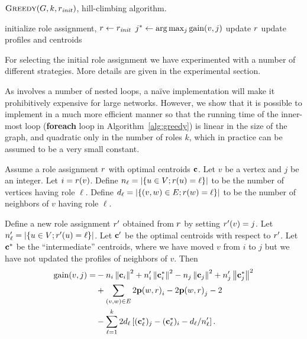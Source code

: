 \begin{algorithm}[t]
\caption{$\textsc{Greedy}(G, k, r_{\mathit{init}})$, hill-climbing algorithm.}
\label{alg:greedy}
initialize role assignment, $r \leftarrow r_{\mathit{init}}$\; 
 {
	 {
		$j^* \define \arg \max_j \gain{v, j}$\;
		 {
			update $r$\;
			update profiles and centroids\;
		}
	}
}
\end{algorithm}

For selecting the initial role assignment
we have experimented with a number of different strategies. 
More details are given in the experimental section.

As \alggreedy involves a number of nested loops, 
a na\"{i}ve implementation will make it prohibitively expensive for large networks.
However, we show that it is possible to implement \alggreedy 
in a much more efficient manner
so that the running time of the inner-most loop
({\bf foreach} loop in Algorithm~\ref{alg:greedy}) 
is linear in the size of the graph, 
and quadratic only in the number of roles $k$, 
which in practice can be assumed to be a very small constant.

\begin{proposition}
\label{prop:fastgain}
Assume a role assignment $r$ with optimal centroids $\mathbf{c}$. 
Let $v$ be a vertex and $j$ be an integer.
Let $i = r(v)$.
Define $n_\ell = {\left|\left\{u \in V ; r(u) = \ell\right\}\right|}$ to be the number of vertices having role $\ell$.
Define $d_\ell = {\left|\left\{(v, w) \in E ; r(w) = \ell\right\}\right|}$ to be the number of neighbors of $v$ having role $\ell$.

Define a new role assignment $r'$ obtained from $r$ by setting $r'(v) = j$.
Let $n'_\ell = {\left|\left\{u \in V ; r'(u) = \ell\right\}\right|}$.
Let $\mathbf{c}'$ be the optimal centroids with respect to $r'$. 
Let $\mathbf{c}^*$ be the ``intermediate'' centroids, where we have moved $v$ from $i$ to $j$ but we have not
updated the profiles of neighbors of $v$.  Then 
\[
\begin{split}
	\gain{v, j} = 
	& - n_i\norm{\centroid_i}^2 + n_i'\norm{\centroid_i^*}^2 - n_j\norm{\centroid_j}^2 + n_j'\norm{\centroid_j^*}^2 \\
	& + \sum_{(v, w) \in E} 2\prof{w, \role}_i - 2\prof{w, \role}_j  - 2  \\
	& - \sum_{\ell = 1}^k 2d_\ell \spr{(\centroid_\ell^*)_j  - (\centroid_\ell^*)_i - d_\ell / n_\ell' }.  \\
\end{split}
\]
\end{proposition}

